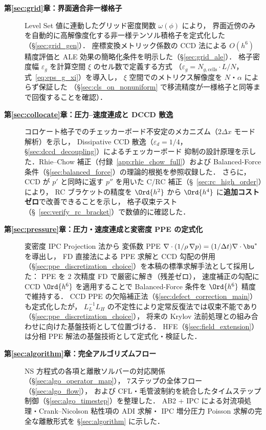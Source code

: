 \begin{description}
  \item[\textbf{第\ref{sec:grid}章：界面適合非一様格子}]
        Level Set 値に連動したグリッド密度関数 $\omega(\phi)$ により，
        界面近傍のみを自動的に高解像度化する非一様テンソル積格子を定式化した（§\ref{sec:grid_gen}）．
        座標変換メトリック係数の CCD 法による $O(h^6)$ 精度評価と
        ALE 効果の簡略化条件を明示した（§\ref{sec:grid_ale}）．
        格子密度幅 $\varepsilon_g$ を計算空間 $\xi$ のセル数で定義する方式
        （$\varepsilon_g = N_{g,\text{cells}} \cdot L/N$，式~\eqref{eq:eps_g_xi}）を導入し，
        $\xi$ 空間でのメトリクス解像度を $N$・$\alpha$ によらず保証した
        （§\ref{sec:cls_on_nonuniform} で移流精度が一様格子と同等まで回復することを確認）．

  \item[\textbf{第\ref{sec:collocate}章：圧力--速度連成と DCCD 散逸}]
        コロケート格子でのチェッカーボード不安定のメカニズム（$2\Delta x$ モード解析）を示し，
        Dissipative CCD 散逸（$\varepsilon_d=1/4$，§\ref{sec:dccd_decoupling}）によるチェッカーボード
        抑制の設計原理を示した．Rhie--Chow 補正（付録~\ref{app:rhie_chow_full}）および
        Balanced-Force 条件（§\ref{sec:balanced_force}）の理論的根拠を参照収録した．
        さらに，CCD が $p'$ と同時に返す $p''$ を用いた C/RC 補正（§~\ref{sec:rc_high_order}）により，
        RC ブラケットの精度を $\Ord{h^2}$ から $\Ord{h^4}$ に\textbf{追加コストゼロ}で改善できることを示し，
        格子収束テスト（§~\ref{sec:verify_rc_bracket}）で数値的に確認した．

  \item[\textbf{第\ref{sec:pressure}章：圧力・速度連成と変密度 PPE の定式化}]
        変密度 IPC Projection 法から
        変係数 PPE $\nabla\cdot(1/\rho\,\nabla p) = (1/\Delta t)\nabla\cdot\bu^*$ を導出し，
        FD 直接法による PPE 求解と CCD 勾配の併用
        （§\ref{sec:ppe_discretization_choice}）を本稿の標準求解手法として採用した：
        PPE を 2 次精度 FD で厳密に解き（残差ゼロ），
        速度補正の勾配に CCD $\Ord{h^6}$ を適用することで
        Balanced-Force 条件を $\Ord{h^6}$ 精度で維持する．
        CCD PPE の欠陥補正法（§\ref{sec:defect_correction_main}）も定式化したが，
        $L_L^{-1} L_H$ の不定性により定常反復法では収束不能であり
        （§\ref{sec:ppe_discretization_choice}），
        将来の Krylov 法前処理との組み合わせに向けた基盤技術として位置づける．
        HFE（§\ref{sec:field_extension}）は分相 PPE 解法の基盤技術として定式化・検証した．

  \item[\textbf{第\ref{sec:algorithm}章：完全アルゴリズムフロー}]
        NS 方程式の各項と離散ソルバーの対応関係（§\ref{sec:algo_operator_map}），
        7ステップの全体フロー（§\ref{sec:algo_flow}），
        および CFL・毛管波制約を統合したタイムステップ制御（§\ref{sec:algo_timestep}）を整理した．
        AB2 + IPC による対流項処理・Crank--Nicolson 粘性項の ADI 求解・
        IPC 増分圧力 Poisson 求解の完全な離散形式を §\ref{sec:algorithm} に示した．
\end{description}

